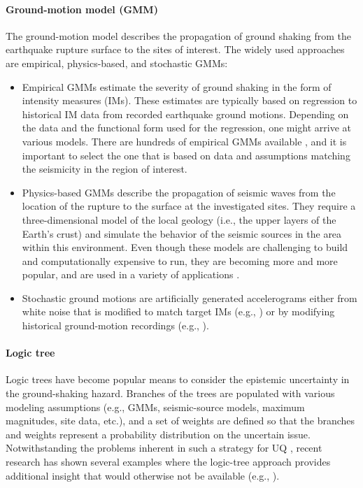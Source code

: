 \paragraph{Ground-motion model (GMM)} The ground-motion model describes the propagation of ground shaking from the earthquake rupture surface to the sites of interest. The widely used approaches are empirical, physics-based, and stochastic GMMs:
\begin{itemize}
    \item Empirical GMMs estimate the severity of ground shaking in the form of intensity measures (IMs). These estimates are typically based on regression to historical IM data from recorded earthquake ground motions. Depending on the data and the functional form used for the regression, one might arrive at various models. There are hundreds of empirical GMMs available \citep{douglas2018ground}, and it is important to select the one that is based on data and assumptions matching the seismicity in the region of interest.
    \item Physics-based GMMs describe the propagation of seismic waves from the location of the rupture to the surface at the investigated sites. They require a three-dimensional model of the local geology (i.e., the upper layers of the Earth's crust) and simulate the behavior of the seismic sources in the area within this environment. Even though these models are challenging to build and computationally expensive to run, they are becoming more and more popular, and are used in a variety of applications \citep{bradley2017guidance}. 
    \item Stochastic ground motions are artificially generated accelerograms either from white noise that is modified to match target IMs (e.g., \cite{rezaeian2011simulation}) or by modifying historical ground-motion recordings (e.g., \cite{atkinson2010inelastic, seifried2016spectral}).
\end{itemize}

\paragraph{Logic tree} Logic trees have become popular means to consider the epistemic uncertainty in the ground-shaking hazard. Branches of the trees are populated with various modeling assumptions (e.g., GMMs, seismic-source models, maximum magnitudes, site data, etc.), and a set of weights are defined so that the branches and weights represent a probability distribution on the uncertain issue. Notwithstanding the problems inherent in such a strategy for UQ \citep{bommer2008use}, recent research has shown several examples where the logic-tree approach provides additional insight that would otherwise not be available (e.g., \cite{goulet2017ngaeast}).

